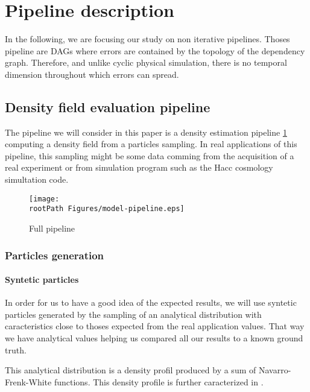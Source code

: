 \documentclass[10pt,a4paper,twoside,twocolumn]{article}
\newcommand*{\rootPath}{../}
\begin{document}
\section{Pipeline description}

In the following, we are focusing our study on non iterative pipelines. Thoses
pipeline are DAGs where errors are contained by the topology of the dependency
graph. Therefore, and unlike cyclic physical simulation, there is no temporal
dimension throughout which errors can spread.

\subsection{Density field evaluation pipeline}

The pipeline we will consider in this paper is a density estimation pipeline
\ref{fig:pipeline} computing a density field from a particles sampling. In real
applications of this pipeline, this sampling might be some data comming from the
acquisition of a real experiment or from simulation program such as the Hacc
cosmology simultation code.

\begin{figure}[!ht]
	\centering
	\texttt{[image: \\rootPath Figures/model-pipeline.eps]}
	\caption{Full pipeline}
	\label{fig:pipeline}
\end{figure}

\subsubsection{Particles generation}

\paragraph{Syntetic particles}

In order for us to have a good idea of the expected results, we will use
syntetic particles generated by the sampling of an analytical distribution with
caracteristics close to thoses expected from the real application values. That
way we have analytical values helping us compared all our results to a known
ground truth.

This analytical distribution is a density profil produced by a sum of
Navarro-Frenk-White functions\cite{navarro96}. This density profile is further
caracterized in .
\end{document}
